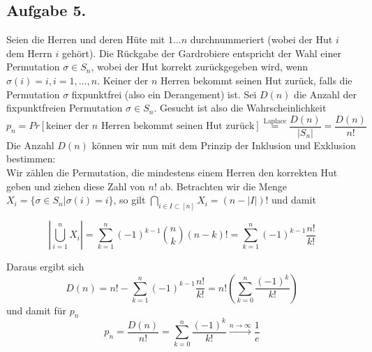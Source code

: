\documentclass[11pt,a4paper,ngerman]{article}
\begin{document}
\subsection*{Aufgabe 5.}
Seien die Herren und deren Hüte mit $1 \ldots n$ durchnummeriert (wobei der Hut $i$ dem Herrn $i$ gehört).
Die Rückgabe der Gardrobiere entspricht der Wahl einer Permutation $\sigma \in S_n$, wobei
der Hut korrekt zurückgegeben wird, wenn $\sigma(i) = i, i = 1,\ldots,n$. Keiner der $n$ Herren bekommt
seinen Hut zurück, falls die Permutation $\sigma$ fixpunktfrei (also ein Derangement) ist. Sei $D(n)$ die
Anzahl der fixpunktfreien Permutation $\sigma \in S_n$.
Gesucht ist also die Wahrscheinlichkeit
$$p_n = Pr[\text{keiner der $n$ Herren bekommt seinen Hut zurück}] \stackrel{\text{Laplace}}{=} \frac{D(n)}{|S_n|} = \frac{D(n)}{n!}$$
Die Anzahl $D(n)$ können wir nun mit dem Prinzip der Inklusion und Exklusion bestimmen: \\
Wir zählen die Permutation, die mindestens einem Herren den korrekten Hut geben und ziehen diese Zahl von $n!$ ab. Betrachten wir die Menge $X_i = \{\sigma \in S_n | \sigma(i) = i \}$, so gilt $\bigcap_{i \in I \subset [n]} X_i = (n - |I|)!$ und damit

$$ |\bigcup_{i = 1}^n X_i | = \sum_{k=1}^n (-1)^{k-1} \binom{n}{k} (n-k)! =  \sum_{k=1}^n (-1)^{k-1} \frac{n!}{k!}$$

Daraus ergibt sich 
$$D(n) = n! - \sum_{k=1}^n (-1)^{k-1} \frac{n!}{k!} = n! \left(\sum_{k=0}^n \frac{ (-1)^{k} }{k!} \right)$$
und damit für $p_n$
$$ p_n = \frac{D(n)}{n!} = \sum_{k=0}^n \frac{ (-1)^{k} }{k!} \stackrel{n \to \infty}{\longrightarrow} \frac{1}{e}$$
\label{LastPage}
\end{document}
